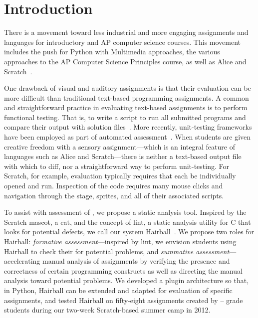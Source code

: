 \section{Introduction}
There is a movement toward less industrial and more engaging assignments and
languages for introductory and AP computer science courses.  This movement
includes the push for Python with Multimedia approaches, the various approaches
to the AP Computer Science Principles course, as well as Alice and
Scratch~\cite{Adams:2012:SLP:2157136.2157319, Forte:2004:CCC:962752.962945,
  Simon:2010:ERC:1822090.1822151, Snyder:2012:FFC:2189835.2189852,
  Cooper:2003:TOI:611892.611966, Maloney:2010:SPL:1868358.1868363}.

One drawback of visual and auditory assignments is that their evaluation can be
more difficult than traditional text-based programming assignments.  A common
and straightforward practice in evaluating text-based assignments is to perform
functional testing. That is, to write a script to run all submitted programs
and compare their output with solution
files~\cite{Jackson:1997:GSP:268084.268210}.  More recently, unit-testing
frameworks have been employed as part of automated
assessment~\cite{Spacco:2006:EMD:1140124.1140131,
  Edwards:2003:RCS:949344.949390}.  When students are given creative freedom
with a sensory assignment---which is an integral feature of languages such as
Alice and Scratch---there is neither a text-based output file with which to
diff, nor a straightforward way to perform unit-testing.  For Scratch, for
example, evaluation typically requires that each \sprogram{} be individually
opened and run.  Inspection of the code requires many mouse clicks and
navigation through the stage, sprites, and all of their associated scripts.

To assist with assessment of , we propose a static analysis tool.
Inspired by the Scratch mascot, a cat, and the concept of lint, a static
analysis utility for C that looks for potential defects, we call our system
Hairball~\cite{Johnson78lint}. We propose two roles for Hairball:
\emph{formative assessment}---inspired by lint, we envision students using
Hairball to check their  for potential problems, and
\emph{summative assessment}---accelerating manual analysis of assignments by
verifying the presence and correctness of certain programming constructs as
well as directing the manual analysis toward potential problems. We developed a
plugin architecture so that, in Python, Hairball can be extended and adapted
for evaluation of specific assignments, and tested Hairball on fifty-eight
assignments created by -- grade students during our two-week
Scratch-based summer camp in 2012.

